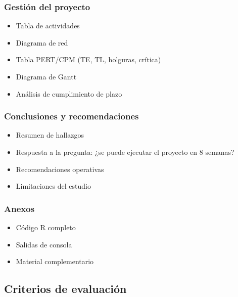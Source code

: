 \documentclass[12pt,a4paper]{article}
\begin{document}
	\subsubsection{Gestión del proyecto}
	\begin{itemize}
		\item Tabla de actividades
		\item Diagrama de red
		\item Tabla PERT/CPM (TE, TL, holguras, crítica)
		\item Diagrama de Gantt
		\item Análisis de cumplimiento de plazo
	\end{itemize}
	
	\subsubsection{Conclusiones y recomendaciones}
	\begin{itemize}
		\item Resumen de hallazgos
		\item Respuesta a la pregunta: ¿se puede ejecutar el proyecto en 8 semanas?
		\item Recomendaciones operativas
		\item Limitaciones del estudio
	\end{itemize}
	
	\subsubsection{Anexos}
	\begin{itemize}
		\item Código R completo
		\item Salidas de consola
		\item Material complementario
	\end{itemize}
	
	\subsection{Criterios de evaluación}
	
\end{document}
